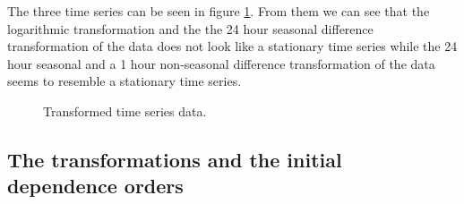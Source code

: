 \documentclass{article}
\begin{document}
The three time series can be seen in figure \ref{fig:ts_trans}. From them we can see that the  logarithmic transformation and the the 24 hour seasonal difference transformation of the data does not look like a stationary time series while the 24 hour seasonal and a 1 hour non-seasonal difference transformation of the data seems to resemble a stationary time series. 

\begin{figure}[ht!]
   \centering
   \caption{Transformed time series data.}
    \label{fig:ts_trans}
\end{figure}




\subsection{The transformations and the initial dependence orders}
\label{ch:ea} 
\end{document}
